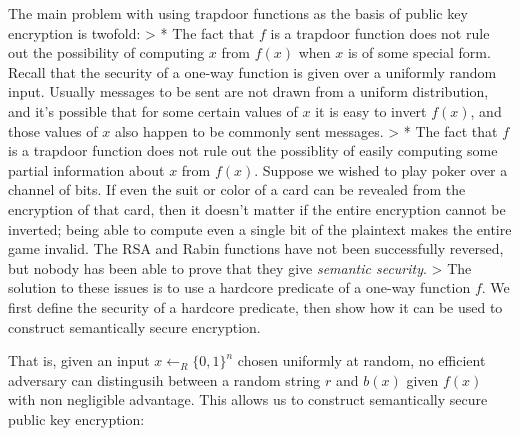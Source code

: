 The main problem with using trapdoor functions as the basis of public
key encryption is twofold: \textgreater{} * The fact that \(f\) is a
trapdoor function does not rule out the possibility of computing \(x\)
from \(f(x)\) when \(x\) is of some special form. Recall that the
security of a one-way function is given over a uniformly random input.
Usually messages to be sent are not drawn from a uniform distribution,
and it's possible that for some certain values of \(x\) it is easy to
invert \(f(x)\), and those values of \(x\) also happen to be commonly
sent messages. \textgreater{} * The fact that \(f\) is a trapdoor
function does not rule out the possiblity of easily computing some
partial information about \(x\) from \(f(x)\). Suppose we wished to play
poker over a channel of bits. If even the suit or color of a card can be
revealed from the encryption of that card, then it doesn't matter if the
entire encryption cannot be inverted; being able to compute even a
single bit of the plaintext makes the entire game invalid. The RSA and
Rabin functions have not been successfully reversed, but nobody has been
able to prove that they give \emph{semantic security}. \textgreater{}
The solution to these issues is to use a hardcore predicate of a one-way
function \(f\). We first define the security of a hardcore predicate,
then show how it can be used to construct semantically secure
encryption.

\hypertarget{HCPdef}{}

That is, given an input \(x \leftarrow_R \{0, 1\}^n\) chosen uniformly
at random, no efficient adversary can distingusih between a random
string \(r\) and \(b(x)\) given \(f(x)\) with non negligible advantage.
This allows us to construct semantically secure public key encryption:

